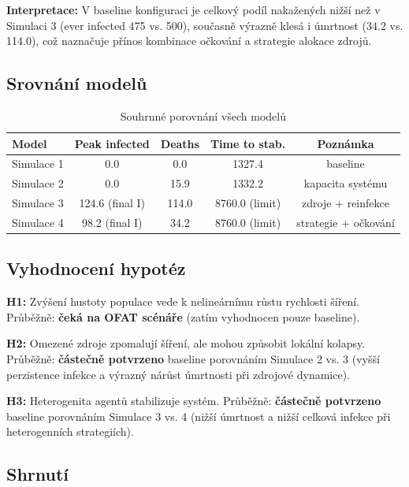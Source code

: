 \textbf{Interpretace:}  
V baseline konfiguraci je celkový podíl nakažených nižší než v Simulaci 3 (ever infected 475 vs. 500), současně výrazně klesá i úmrtnost (34.2 vs. 114.0), což naznačuje přínos kombinace očkování a strategie alokace zdrojů.

\subsection{Srovnání modelů}

\begin{table}[h]
\centering
\begin{tabular}{l c c c c}
\hline
\textbf{Model} & \textbf{Peak infected} & \textbf{Deaths} & \textbf{Time to stab.} & \textbf{Poznámka} \\
\hline
Simulace 1 & 0.0 & 0.0 & 1327.4 & baseline \\
Simulace 2 & 0.0 & 15.9 & 1332.2 & kapacita systému \\
Simulace 3 & 124.6 (final I) & 114.0 & 8760.0 (limit) & zdroje + reinfekce \\
Simulace 4 & 98.2 (final I) & 34.2 & 8760.0 (limit) & strategie + očkování \\
\hline
\end{tabular}
\caption{Souhrnné porovnání všech modelů}
\label{tab:all_models}
\end{table}

\subsection{Vyhodnocení hypotéz}

\textbf{H1:} Zvýšení hustoty populace vede k nelineárnímu růstu rychlosti šíření.  
Průběžně: \textbf{čeká na OFAT scénáře} (zatím vyhodnocen pouze baseline).

\textbf{H2:} Omezené zdroje zpomalují šíření, ale mohou způsobit lokální kolapsy.  
Průběžně: \textbf{částečně potvrzeno} baseline porovnáním Simulace 2 vs. 3 (vyšší perzistence infekce a výrazný nárůst úmrtnosti při zdrojové dynamice).

\textbf{H3:} Heterogenita agentů stabilizuje systém.  
Průběžně: \textbf{částečně potvrzeno} baseline porovnáním Simulace 3 vs. 4 (nižší úmrtnost a nižší celková infekce při heterogenních strategiích).

\subsection{Shrnutí}

